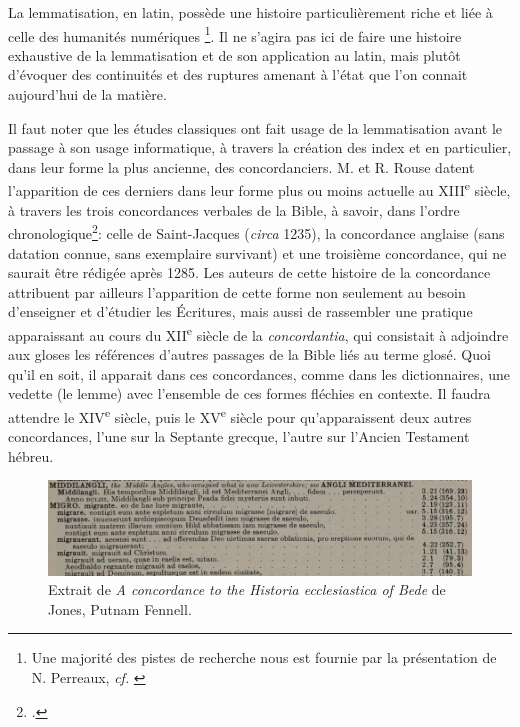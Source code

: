 La lemmatisation, en latin, possède une histoire particulièrement riche et liée à celle des humanités numériques \footnote{Une majorité des pistes de recherche nous est fournie par la présentation de N. Perreaux, \textit{cf.} \cite{perreaux_lemmatisation_2019}}. Il ne s'agira pas ici de faire une histoire exhaustive de la lemmatisation et de son application au latin, mais plutôt d'évoquer des continuités et des ruptures amenant à l'état que l'on connait aujourd'hui de la matière.

Il faut noter que les études classiques ont fait usage de la lemmatisation avant le passage à son usage informatique, à travers la création des index et en particulier, dans leur forme la plus ancienne, des concordanciers. M. et R. Rouse datent l'apparition de ces derniers dans leur forme plus ou moins actuelle au XIII\textsuperscript{e} siècle, à travers les trois concordances verbales de la Bible, à savoir, dans l'ordre chronologique\footcite{rouse_concordance_1984}: celle de Saint-Jacques (\textit{circa} 1235), la concordance anglaise (sans datation connue, sans exemplaire survivant) et une troisième concordance, qui ne saurait être rédigée après 1285. Les auteurs de cette histoire de la concordance attribuent par ailleurs l'apparition de cette forme non seulement au besoin d'enseigner et d'étudier les Écritures, mais aussi de rassembler une pratique apparaissant au cours du XII\textsuperscript{e} siècle de la \textit{concordantia}, qui consistait à adjoindre aux gloses les références d'autres passages de la Bible liés au terme glosé. Quoi qu'il en soit, il apparait dans ces concordances, comme dans les dictionnaires, une vedette (le lemme) avec l'ensemble de ces formes fléchies en contexte. Il faudra attendre le XIV\textsuperscript{e} siècle, puis le XV\textsuperscript{e} siècle pour qu'apparaissent deux autres concordances, l'une sur la Septante grecque, l'autre sur l'Ancien Testament hébreu.

\begin{figure}[h]
    \centering
    \includegraphics[width=\textwidth]{figures/chap3/JonesConcordance.png}
    \caption{Extrait de  \textit{A concordance to the Historia ecclesiastica of Bede} de Jones, Putnam Fennell.}
    \label{fig:chap3:concordance_jones}
\end{figure}


